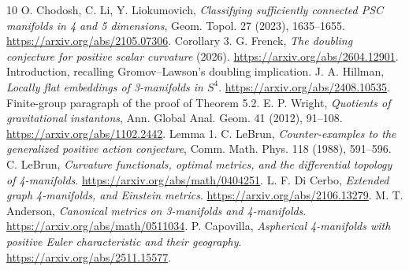\documentclass[11pt]{article}
\begin{document}
\begin{thebibliography}{10}
 O. Chodosh, C. Li, Y. Liokumovich,
\emph{Classifying sufficiently connected PSC manifolds in 4 and 5 dimensions},
Geom. Topol. 27 (2023), 1635--1655.
\url{https://arxiv.org/abs/2105.07306}. Corollary 3.
 G. Frenck,
\emph{The doubling conjecture for positive scalar curvature} (2026).
\url{https://arxiv.org/abs/2604.12901}.
Introduction, recalling Gromov--Lawson's doubling implication.
 J. A. Hillman,
\emph{Locally flat embeddings of 3-manifolds in $S^4$}.
\url{https://arxiv.org/abs/2408.10535}.
Finite-group paragraph of the proof of Theorem 5.2.
 E. P. Wright,
\emph{Quotients of gravitational instantons},
Ann. Global Anal. Geom. 41 (2012), 91--108.
\url{https://arxiv.org/abs/1102.2442}. Lemma 1.
 C. LeBrun,
\emph{Counter-examples to the generalized positive action conjecture},
Comm. Math. Phys. 118 (1988), 591--596.
 C. LeBrun,
\emph{Curvature functionals, optimal metrics, and the differential topology
of 4-manifolds}.
\url{https://arxiv.org/abs/math/0404251}.
 L. F. Di Cerbo,
\emph{Extended graph 4-manifolds, and Einstein metrics}.
\url{https://arxiv.org/abs/2106.13279}.
 M. T. Anderson,
\emph{Canonical metrics on 3-manifolds and 4-manifolds}.
\url{https://arxiv.org/abs/math/0511034}.
 P. Capovilla,
\emph{Aspherical 4-manifolds with positive Euler characteristic and
their geography}.
\url{https://arxiv.org/abs/2511.15577}.
\end{thebibliography}
\end{document}
